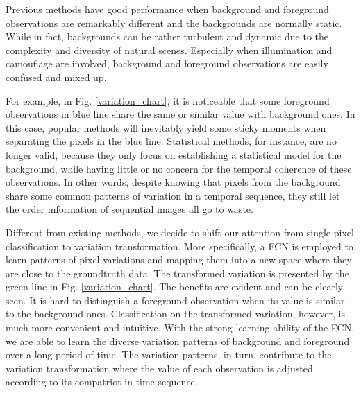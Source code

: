 \documentclass[journal]{IEEEtran}
\newcommand{\reffig}[1]{Fig. \ref{#1}}
\begin{document}

Previous methods have good performance when background and foreground observations are remarkably different and the backgrounds are normally static. 
While in fact, backgrounds can be rather turbulent and dynamic due to the complexity and diversity of natural scenes. 
Especially when illumination and camouflage are involved, background and foreground observations are easily confused and mixed up. 

For example, in \reffig{variation_chart}, it is noticeable that some foreground observations in blue line share the same or similar value with background ones. 
In this case, popular methods will inevitably yield some sticky moments when separating the pixels in the blue line. 
Statistical methods, for instance, are no longer valid, because they only focus on establishing a statistical model for the background, while having little or no concern for the temporal coherence of these observations. 
In other words, despite knowing that pixels from the background share some common patterns of variation in a temporal sequence, they still let the order information of sequential images all go to waste. 

Different from existing methods, we decide to shift our attention from single pixel classification to variation transformation.
More specifically, a FCN is employed to learn patterns of pixel variations and mapping them into a new space where they are close to the groundtruth data.
The transformed variation is presented by the green line in \reffig{variation_chart}. 
The benefits are evident and can be clearly seen. 
It is hard to distinguish a foreground observation when its value is similar to the background ones. 
Classification on the transformed variation, however, is much more convenient and intuitive. 
With the strong learning ability of the FCN, we are able to learn the diverse variation patterns of background and foreground over a long period of time.
The variation patterns, in turn, contribute to the variation transformation where the value of each observation is adjusted according to its compatriot in time sequence.
\end{document}

